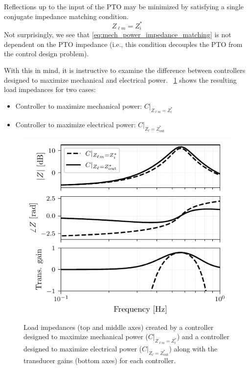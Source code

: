 \documentclass[lettersize,journal]{IEEEtran}
\begin{document}
Reflections up to the input of the PTO may be minimized by satisfying a single conjugate impedance matching condition.
%
\begin{equation}
        Z_{\ell m} = Z_i^*
        \label{eq:mech_power_impedance_matching}
\end{equation}
%
Not surprisingly, we see that \eqref{eq:mech_power_impedance_matching} is not dependent on the PTO impedance (i.e., this condition decouples the PTO from the control design problem).

With this in mind, it is instructive to examine the difference between controllers designed to maximize mechanical and electrical power.
\figurename~\ref{fig:wec_as_multiport_load_impedance_for_mech_power} shows the resulting load impedances for two cases:

\begin{itemize}
        \item Controller to maximize mechanical power: $C \vert_{Z_{\ell m} = Z_i^*}$
        \item Controller to maximize electrical power: $C \vert_{Z_\ell = Z_{\mathrm{out}}^*}$
\end{itemize}%
%
\begin{figure}[tb]
        \centering
        \includegraphics[width=1\columnwidth]{wec_as_multiport_load_impedance_for_mech_power_Bode.pdf}
        \caption{Load impedances (top and middle axes) created by a controller designed to maximize mechanical power ($C \vert_{Z_{\ell m} = Z_i^*}$) and a controller designed to maximize electrical power ($C \vert_{Z_\ell = Z_{\mathrm{out}}^*}$) along with the transducer gains (bottom axes) for each controller.}
        \label{fig:wec_as_multiport_load_impedance_for_mech_power}
\end{figure}
\end{document}

